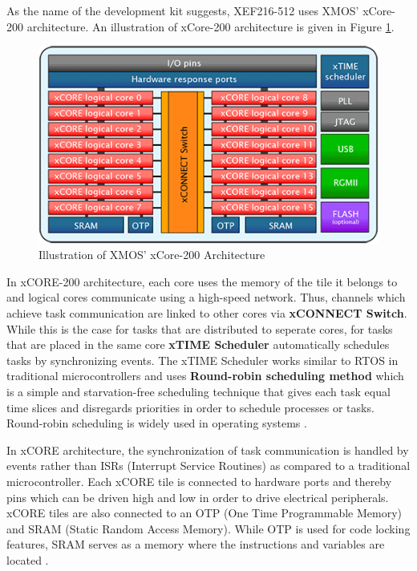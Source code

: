 As the name of the development kit suggests, XEF216-512 uses XMOS' xCore-200 architecture. An illustration of xCore-200 architecture is given in Figure \ref{fig:XE216Architecture}.
\begin{figure}[!ht]
	\centering
	\captionsetup{justification=centering}
	\includegraphics[scale=0.7]{content/images/XE216Architecture.png}
	\caption{Illustration of XMOS' xCore-200 Architecture \cite{xmosflyer}}
	\label{fig:XE216Architecture}
\end{figure}

In xCORE-200 architecture, each core uses the memory of the tile it belongs to and logical cores communicate using a high-speed network. Thus, channels which achieve task communication are linked to other cores via \textbf{xCONNECT Switch}. While this is the case for tasks that are distributed to seperate cores, for tasks that are placed in the same core \textbf{xTIME Scheduler} automatically schedules tasks by synchronizing events. The xTIME Scheduler works similar to RTOS in traditional microcontrollers and uses \textbf{Round-robin scheduling method} \cite{xmosdatasheet} \cite{roundrobin} which is a simple and starvation-free scheduling technique that gives each task equal time slices and disregards priorities in order to schedule processes or tasks. Round-robin scheduling is widely used in operating systems \cite{roundrobin}.

In xCORE architecture, the synchronization of task communication is handled by events rather than ISRs (Interrupt Service Routines) as compared to a traditional microcontroller. Each xCORE tile is connected to hardware ports and thereby pins which can be driven high and low in order to drive electrical peripherals. xCORE tiles are also connected to an OTP (One Time Programmable Memory) and SRAM (Static Random Access Memory). While OTP is used for code locking features, SRAM serves as a memory where the instructions and variables are located \cite{xmosdatasheet}.

